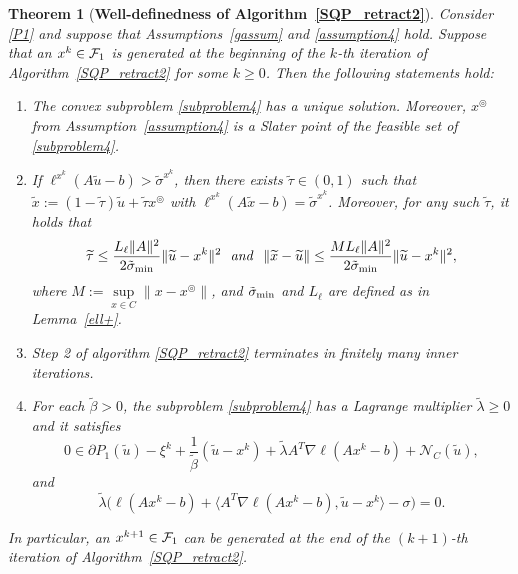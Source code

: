 \documentclass[10pt]{article}
\numberwithin{equation}{section}
\newtheorem{theorem}{Theorem}[section]
\def\sigmamin{{\rm\tilde{\sigma}_{min}}}
\def\xfeasss{x^\circledcirc}
\begin{document}
\begin{theorem}[{{\bf Well-definedness of Algorithm~\ref{SQP_retract2}}}]\label{welldef2}
Consider \eqref{P1} and suppose that Assumptions~\ref{gassum} and \ref{assumption4} hold. Suppose that an $x^k\in {\cal F}_1$ is generated {\color{black} at the beginning of the $k$-th iteration} of Algorithm~\ref{SQP_retract2} for some $k\ge 0$. Then the following statements hold:
\begin{enumerate}[{\rm (i)}]
   \item The convex subproblem \eqref{subproblem4} has a unique solution. Moreover, $\xfeasss$ from Assumption~\ref{assumption4} is a Slater point of the feasible set of \eqref{subproblem4}.
   \item If $\ell^{x^k}(A\widetilde{u} - b) > \tilde{\sigma}^{x^k}$, then there exists $\widetilde{\tau}\in (0, 1)$ such that $\widetilde{x}:=(1 - \widetilde{\tau})\widetilde{u} + \widetilde{\tau} \xfeasss$ with $\ell^{x^k}(A\widetilde{x} - b) = \tilde{\sigma}^{x^k}$. Moreover, for any such $\widetilde\tau$, it holds that
       \[
       \widetilde{\tau} \leq \frac{L_{\ell}\|A\|^2}{2\sigmamin}\|\widetilde{u} - x^k\|^2
       \ \ {\it and}\ \ \|\widetilde{x} - \widetilde{u}\| \leq \frac{ML_{\ell}\|A\|^2}{2\sigmamin}\|\widetilde{u} - x^k\|^2,
       \]
       where $M := \sup\limits_{x\in C}\|x - \xfeasss\|$, and $\sigmamin$ and $L_\ell$ are defined as in Lemma~\ref{ell+}.
   \item Step 2 of algorithm \ref{SQP_retract2} terminates in finitely many inner iterations.
   \item For each $\widetilde{\beta} > 0$, the subproblem \eqref{subproblem4} has a Lagrange multiplier $\widetilde\lambda\geq 0$ and it satisfies
       \begin{equation*}
       0\in \partial P_1(\widetilde{u}) - \xi^k +\frac{1}{\widetilde{\beta}}(\widetilde{u} - x^k) +\widetilde\lambda A^T\nabla\ell(Ax^k - b) + \mathcal{N}_C(\widetilde{u}),
       \end{equation*}
       and
       \begin{equation*}
       \widetilde\lambda\big(\ell(Ax^k - b) + \langle A^T\nabla\ell(Ax^k - b), \widetilde{u}-x^k\rangle - \sigma\big) = 0.
       \end{equation*}
 \end{enumerate}
 In particular, an $x^{k+1}\in {\cal F}_1$ can be generated at the end of the $(k + 1)$-th iteration of Algorithm~\ref{SQP_retract2}.
\end{theorem}
\end{document}
